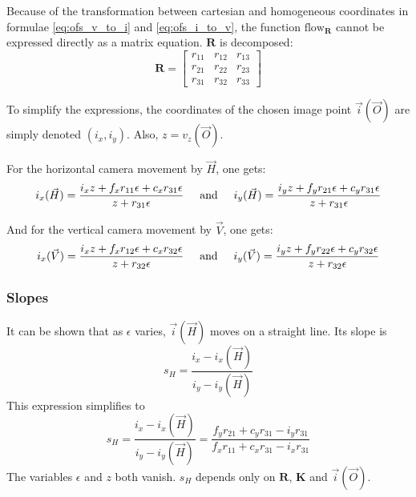 \documentclass[11pt]{scrreprt}
\newcommand{\matr}[1]{\mathbf{#1}}
\begin{document}
Because of the transformation between cartesian and homogeneous coordinates in formulae \ref{eq:ofs_v_to_i} and \ref{eq:ofs_i_to_v}, the function $\text{flow}_{\matr{R}}$ cannot be expressed directly as a matrix equation. $\matr{R}$ is decomposed:
\begin{equation}
\matr{R} = \begin{bmatrix}
	r_{11} & r_{12} & r_{13} \\
	r_{21} & r_{22} & r_{23} \\
	r_{31} & r_{32} & r_{33}
\end{bmatrix}
\end{equation}

To simplify the expressions, the coordinates of the chosen image point $\vec{i}(\vec{O})$ are simply denoted $(i_x, i_y)$. Also, $z = v_z(\vec{O})$.

For the horizontal camera movement by $\vec{H}$, one gets:
\begin{equation}
i_x(\vec{H}) = \frac{i_x z + f_x r_{11} \epsilon + c_x r_{31} \epsilon}{z + r_{31} \epsilon}
\hspace{5mm} \text{and} \hspace{5mm}
i_y(\vec{H}) = \frac{i_y z + f_y r_{21} \epsilon + c_y r_{31} \epsilon}{z + r_{31} \epsilon}
\end{equation}

And for the vertical camera movement by $\vec{V}$, one gets:
\begin{equation}
i_x(\vec{V}) = \frac{i_x z + f_x r_{12} \epsilon + c_x r_{32} \epsilon}{z + r_{32} \epsilon}
\hspace{5mm} \text{and} \hspace{5mm}
i_y(\vec{V}) = \frac{i_y z + f_y r_{22} \epsilon + c_y r_{32} \epsilon}{z + r_{32} \epsilon}
\end{equation}


\subsubsection{Slopes}
It can be shown that as $\epsilon$ varies, $\vec{i}(\vec{H})$ moves on a straight line. Its slope is
\begin{equation}
s_H = \frac{i_x - i_x(\vec{H})}{i_y - i_y(\vec{H})}
\end{equation}
This expression simplifies to
\begin{equation}
s_H = \frac{i_x - i_x(\vec{H})}{i_y - i_y(\vec{H})} = \frac{f_y r_{21} + c_y r_{31} - i_y r_{31}}{f_x r_{11} + c_x r_{31} - i_x r_{31}}
\end{equation}
The variables $\epsilon$ and $z$ both vanish. $s_H$ depends only on $\matr{R}$, $\matr{K}$ and $\vec{i}(\vec{O})$.
\end{document}
